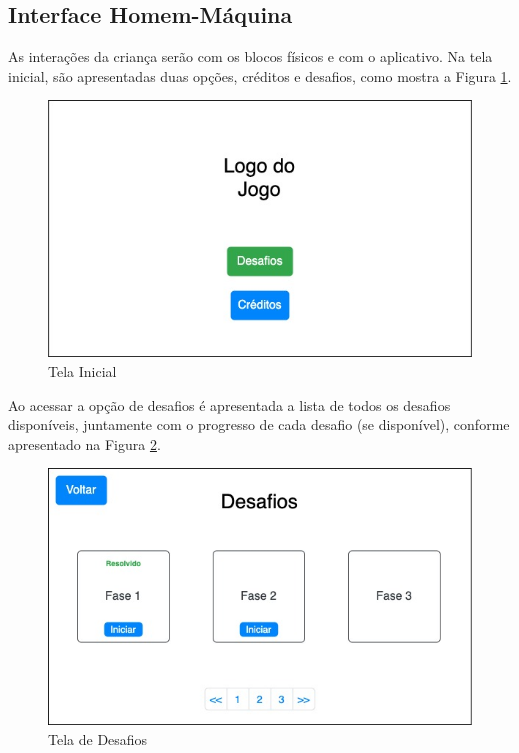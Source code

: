     \subsection{Interface Homem-Máquina}
    As interações da criança serão com os blocos físicos e com o aplicativo.
    Na tela inicial, são apresentadas duas opções, créditos e desafios, como mostra a Figura \ref{figura:tela_inicial}.
    
    \begin{figure}[H]
        \caption{Tela Inicial}
        \begin{center}
            \includegraphics[width=\linewidth]{Imagens/cap3/Tela Inicial.jpg}
        \end{center}
        \label{figura:tela_inicial}
    \end{figure}
    
    Ao acessar a opção de desafios é apresentada a lista de todos os desafios disponíveis, juntamente com o progresso de cada desafio (se disponível), conforme apresentado na Figura \ref{figura:tela_desafios}.
    
    \begin{figure}[H]
        \caption{Tela de Desafios}
        \begin{center}
            \includegraphics[width=\linewidth]{Imagens/cap3/tela_desafios.jpg}
        \end{center}
        \label{figura:tela_desafios}
    \end{figure}
    
